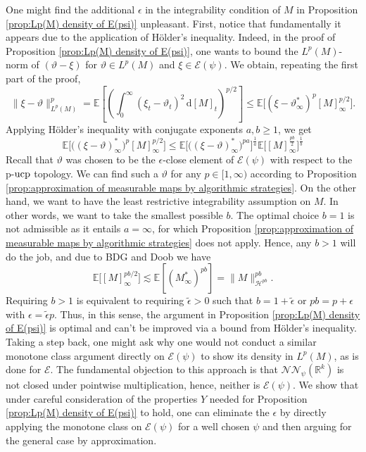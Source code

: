 \documentclass[11pt,a4paper,twoside,openany]{report}
\numberwithin{equation}{section}
\newcommand{\diff}{\mathrm{d}}
\theoremstyle{plain} %
\theoremstyle{definition} %
\theoremstyle{remark} %
\begin{document}
One might find the additional \(\epsilon\) in the integrability condition of \(M\) in Proposition \ref{prop:Lp(M) density of E(psi)} unpleasant. First, notice that fundamentally it appears due to the application of Hölder's inequality. Indeed, in the proof of Proposition \ref{prop:Lp(M) density of E(psi)}, one wants to bound the \(L^p(M)\)-norm of \((\vartheta-\xi)\) for \(\vartheta\in L^p(M)\) and \(\xi\in\mathcal{E}(\psi)\). We obtain, repeating the first part of the proof, 
 \begin{equation*}
        \rVert \xi-\vartheta\lVert_{L^p(M)}^p=\mathbb{E}[(\int_{0}^{\infty}(\xi_t-\vartheta_t)^2\,\diff[M]_t)^{p/2}]\leq\mathbb{E}\big[(\xi-\vartheta_{\infty}^*)^p[M]_{\infty}^{p/2}\big].
\end{equation*}
Applying Hölder's inequality with conjugate exponents \(a,b\geq 1\), we get 
\begin{equation*}
    \mathbb{E}\big[\big((\xi-\vartheta)_{\infty}^*\big)^p[M]_{\infty}^{p/2}\big]\leq \mathbb{E}\big[\big((\xi-\vartheta)_{\infty}^*\big)^{pa}\big]^{\frac{1}{a}}\mathbb{E}\big[[M]_{\infty}^{\frac{pb}{2}}\big]^{\frac{1}{b}}
\end{equation*}
Recall that \(\vartheta\) was chosen to be the \(\epsilon\)-close element of \(\mathcal{E}(\psi)\) with respect to the p-\(\rm{ucp}\) topology. We can find such a \(\vartheta\) for any \(p\in[1,\infty)\) according to Proposition \ref{prop:approximation of measurable maps by algorithmic strategies}. On the other hand, we want to have the least restrictive integrability assumption on \(M\). In other words, we want to take the smallest possible \(b\). The optimal choice \(b=1\) is not admissible as it entails \(a=\infty\), for which Proposition \ref{prop:approximation of measurable maps by algorithmic strategies} does not apply. Hence, any \(b>1\) will do the job, and due to BDG and Doob we have
\begin{equation*}
    \mathbb{E}\big[[M]_{\infty}^{pb/2}\big]\lesssim\mathbb{E}[(M_{\infty}^*)^{pb}]=\lVert M\rVert_{\mathcal{H}^{pb}}^{pb}.
\end{equation*}
Requiring \(b>1\) is equivalent to requiring \(\tilde{\epsilon}>0\) such that \(b=1+\tilde{\epsilon}\) or \(pb=p+\epsilon\) with \(\epsilon=\tilde{\epsilon}p\). Thus, in this sense, the argument in Proposition \ref{prop:Lp(M) density of E(psi)} is optimal and can't be improved via a bound from Hölder's inequality. Taking a step back, one might ask why one would not conduct a similar monotone class argument directly on \(\mathcal{E}(\psi)\) to show its density in \(L^p(M)\), as is done for \(\mathcal{E}\). The fundamental objection to this approach is that \(\mathcal{NN}_{\psi}(\mathbb{R}^k)\) is not closed under pointwise multiplication, hence, neither is \(\mathcal{E}(\psi)\). We show that under careful consideration of the properties \(Y\) needed for Proposition \ref{prop:Lp(M) density of E(psi)} to hold, one can eliminate the \(\epsilon\) by directly applying the monotone class on \(\mathcal{E}(\psi)\) for a well chosen \(\psi\) and then arguing for the general case by approximation.
\end{document}
